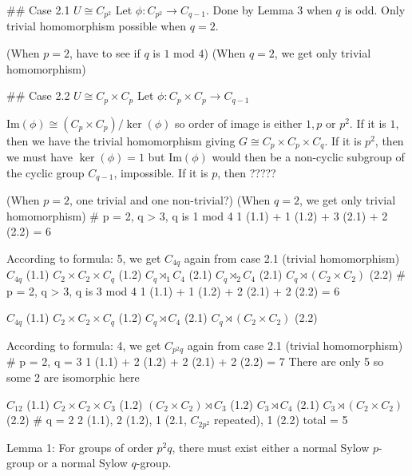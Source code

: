 ## Case 2.1 $U \cong C_{p^2}$
Let $\phi : C_{p^2} \rightarrow C_{q-1}$. Done by Lemma 3 when $q$ is odd. Only trivial homomorphism possible when $q = 2$.

(When $p = 2$, have to see if $q$ is $1$ mod $4$)
(When $q = 2$, we get only trivial homomorphism)

## Case 2.2 $U \cong C_p \times C_p$
Let $\phi : C_p \times C_p \rightarrow C_{q-1}$

$\text{Im}(\phi) \cong (C_p \times C_p) / \ker(\phi)$ so order of image is either $1, p$ or $p^2$. If it is $1$, then we have the trivial homomorphism giving $G \cong C_p \times C_p \times C_{q}$. If it is $p^2$, then we must have $\ker(\phi) = 1$ but $\text{Im}(\phi)$ would then be a non-cyclic subgroup of the cyclic group $C_{q-1}$, impossible. If it is $p$, then ?????

(When $p = 2$, one trivial and one non-trivial?)
(When $q = 2$, we get only trivial homomorphism)
# p = 2, q > 3, q is 1 mod 4
1 (1.1) + 1 (1.2) + 3 (2.1) + 2 (2.2) = 6

According to formula: 5, we get $C_{4q}$ again from case 2.1 (trivial homomorphism)
$C_{4q}$ (1.1)
$C_2 \times C_2 \times C_q$ (1.2)
$C_q \rtimes_1 C_4$ (2.1)
$C_q \rtimes_2 C_4$ (2.1)
$C_q \rtimes (C_2 \times C_2)$ (2.2)
# p = 2, q > 3, q is 3 mod 4
1 (1.1) + 1 (1.2) + 2 (2.1) + 2 (2.2) = 6

$C_{4q}$ (1.1)
$C_2 \times C_2 \times C_q$ (1.2)
$C_q \rtimes C_4$ (2.1)
$C_q \rtimes (C_2 \times C_2)$ (2.2)

According to formula: 4, we get $C_{p^2 q}$ again from case 2.1 (trivial homomorphism)
# p = 2, q = 3
1 (1.1) + 2 (1.2) + 2 (2.1) + 2 (2.2) = 7
There are only 5 so some 2 are isomorphic here

$C_{12}$ (1.1)
$C_2 \times C_2 \times C_3$ (1.2)
$(C_2 \times C_2) \rtimes C_3$ (1.2)
$C_3 \rtimes C_4$ (2.1)
$C_3 \rtimes (C_2 \times C_2)$ (2.2)
# q = 2
2 (1.1), 2 (1.2), 1 (2.1, $C_{2p^2}$ repeated), 1 (2.2) total = 5








Lemma 1: For groups of order $p^2 q$, there must exist either a normal Sylow $p$-group or a normal Sylow $q$-group.

